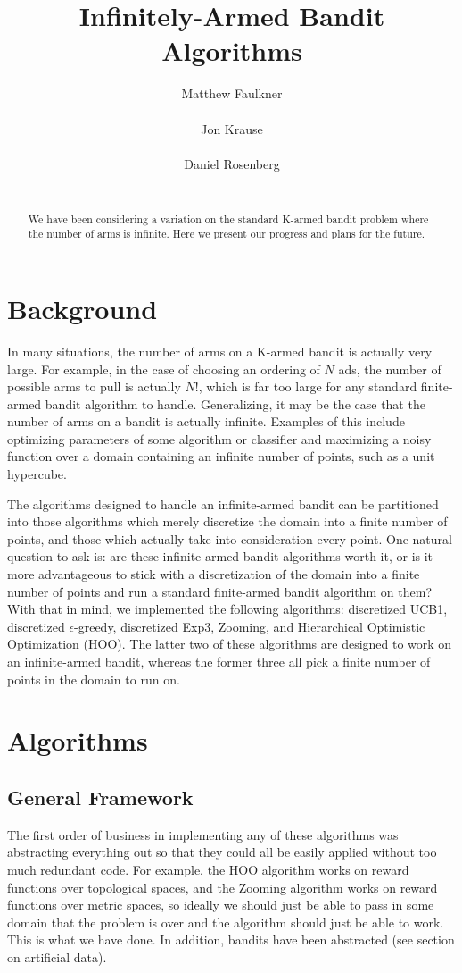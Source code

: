 \documentclass{article}
\title{Infinitely-Armed Bandit Algorithms}
\author{
Matthew Faulkner\\
\\
\And
Jon Krause \\
\\
\And
Daniel Rosenberg \\
\\
}
\begin{document}
\maketitle

\begin{abstract}
We have been considering a variation on the standard K-armed bandit 
problem where the number of arms is infinite.  Here we present
our progress and plans for the future.
\end{abstract}

\section{Background}
In many situations, the number of arms on a K-armed bandit is actually
very large.  For example, in the case of choosing an ordering of $N$ ads,
the number of possible arms to pull is actually $N!$, which is far too
large for any standard finite-armed bandit algorithm to handle.
Generalizing, it may be the case that the number of arms on a bandit is
actually infinite.  Examples of this include optimizing parameters of
some algorithm or classifier and maximizing a noisy function over a domain
containing an infinite number of points, such as a unit hypercube.

The algorithms designed to handle an infinite-armed bandit can be
partitioned into those algorithms which merely discretize the domain
into a finite number of points, and those which actually take into
consideration every point.  One natural question to ask is: are these
infinite-armed bandit algorithms worth it, or is it more advantageous
to stick with a discretization of the domain into a finite number of
points and run a standard finite-armed bandit algorithm on them?
With that in mind, we implemented the following algorithms: discretized
UCB1, discretized $\epsilon$-greedy, discretized Exp3, Zooming, and
Hierarchical Optimistic Optimization (HOO).  The latter two of these
algorithms are designed to work on an infinite-armed bandit, whereas the
former three all pick a finite number of points in the domain to run on.


\section{Algorithms}
\subsection{General Framework}
The first order of business in implementing any of these algorithms was
abstracting everything out so that they could all be easily applied
without too much redundant code.  For example, the HOO algorithm works
on reward functions over topological spaces, and the Zooming algorithm
works on reward functions over metric spaces, so ideally we should just
be able to pass in some domain that the problem is over and the algorithm
should just be able to work.  This is what we have done.  In addition,
bandits have been abstracted (see section on artificial data).
\end{document}
